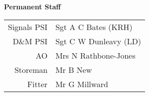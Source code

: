 \begin{center}
  \Large
  \textbf{Permanent Staff}
\end{center}

\begin{center}
  \begin{tabular}{rl}
    Signals PSI & Sgt A C Bates (KRH) \\
    D\&M PSI & Sgt C W Dunleavy (LD) \\
    AO & Mrs N Rathbone-Jones \\
    Storeman & Mr B New \\
    Fitter & Mr G Millward \\
  \end{tabular}
\end{center}
